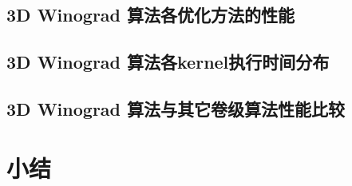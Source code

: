 \subsection{3D Winograd 算法各优化方法的性能}


\subsection{3D Winograd 算法各kernel执行时间分布}


\subsection{3D Winograd 算法与其它卷级算法性能比较}


\section{小结}

